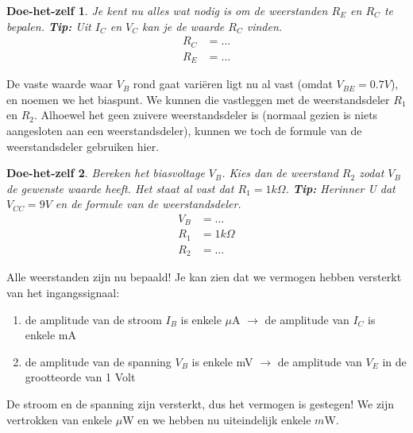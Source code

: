 \documentclass{article}
\newtheorem{DIY}{Doe-het-zelf}
\begin{document}
				\begin{DIY} Je kent nu alles wat nodig is om de weerstanden $R_{E}$ en $ R_{C}$ te bepalen. \textbf{Tip:} Uit $I_C$ en $V_C$ kan je de waarde $R_C$ vinden.
				\begin{align}
				    R_C &= \ldots \\
				    R_E &= \ldots
				\end{align}
				\end{DIY}				

				De vaste waarde waar $V_B$ rond gaat vari\"eren ligt nu al vast (omdat $V_{BE} = 0.7V$), en noemen we het biaspunt. We kunnen die vastleggen met de weerstandsdeler $R_1$ en $R_2$. Alhoewel het geen zuivere weerstandsdeler is (normaal gezien is niets aangesloten aan een weerstandsdeler), kunnen we toch de formule van de weerstandsdeler gebruiken hier.

				\begin{DIY} Bereken het biasvoltage $V_B$. Kies dan de weerstand $R_2$ zodat $V_B$ de gewenste waarde heeft. Het staat al vast dat $R_1 = 1k\Omega$. \textbf{Tip:} Herinner U dat $V_{CC} = 9V$ en de formule van de weerstandsdeler.
				\begin{align}
					V_B &= \ldots \\
				    R_1 &= 1k\Omega \\
				    R_2 &= \ldots
				\end{align}
				\end{DIY}

				Alle weerstanden zijn nu bepaald! Je kan zien dat we vermogen hebben versterkt van het ingangssignaal:

				\begin{enumerate}
				 	\item de amplitude van de stroom $I_B$ is enkele $\mu$A $\rightarrow$ de amplitude van $I_C$ is enkele mA
				 	\item de amplitude van de spanning $V_B$ is enkele mV $\rightarrow$ de amplitude van $V_E$ in de grootteorde van 1 Volt
				 \end{enumerate} 

				 De stroom en de spanning zijn  versterkt, dus het vermogen is gestegen! We zijn vertrokken van enkele $\mu$W en we hebben nu uiteindelijk enkele $m$W. 


\end{document}
